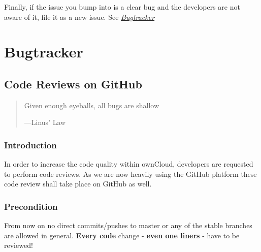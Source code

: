 \documentclass[letterpaper,10pt,english]{sphinxmanual}
\begin{document}
Finally, if the issue you bump into is a clear bug and the developers are not aware of it, file it as a new issue. See {\hyperref[bugtracker/index::doc]{\emph{Bugtracker}}}


\section{Bugtracker}
\label{bugtracker/index:bugtracker}\label{bugtracker/index::doc}

\subsection{Code Reviews on GitHub}
\label{bugtracker/codereviews::doc}\label{bugtracker/codereviews:code-reviews-on-github}\begin{quote}

Given enough eyeballs, all bugs are shallow

\begin{flushright}
---Linus' Law
\end{flushright}
\end{quote}


\subsubsection{Introduction}
\label{bugtracker/codereviews:introduction}
In order to increase the code quality within ownCloud, developers are requested
to perform code reviews.  As we are now heavily using the GitHub platform these
code review shall take place on GitHub as well.


\subsubsection{Precondition}
\label{bugtracker/codereviews:precondition}
From now on no direct commits/pushes to master or any of the stable branches are
allowed in general.  \textbf{Every code} change - \textbf{even one liners} - have to be
reviewed!
\end{document}
